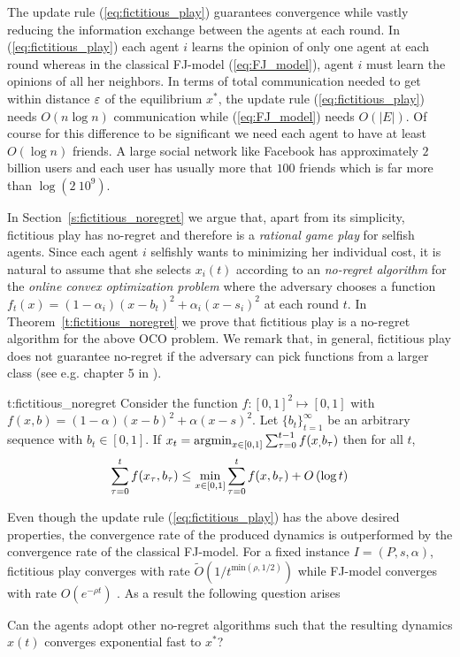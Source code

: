 The update rule (\ref{eq:fictitious_play}) guarantees convergence
while vastly reducing the information exchange between the agents
at each round. In (\ref{eq:fictitious_play}) each agent $i$ learns the opinion of only one agent
at each round whereas in the classical FJ-model (\ref{eq:FJ_model}), agent $i$ must
learn the opinions of all her neighbors. In terms of
total communication needed to get within distance $\varepsilon$ of the
equilibrium $x^*$, the update rule (\ref{eq:fictitious_play}) needs
$O(n \log n)$ communication while (\ref{eq:FJ_model}) needs
$O(|E|)$. Of course for this difference to be significant we need
each agent to have at least $O(\log n)$ friends. A large social
network like Facebook has approximately $2$ billion users and each user
has usually more that $100$ friends which is far more than $\log(2\ 10^9)$.

In Section~\ref{s:fictitious_noregret} we argue that, 
apart from its simplicity, fictitious play has no-regret
and therefore is a \emph{rational game play} for selfish agents.
Since each agent $i$ selfishly wants to minimizing her individual cost,
it is natural to assume that she selects $x_i(t)$ according to
an \emph{no-regret algorithm} for the \emph{online convex optimization problem}
where the adversary chooses a function $f_t(x)=(1-\alpha_i)(x-b_t)^2 + \alpha_i(x-s_i)^2$
at each round $t$. In Theorem~\ref{t:fictitious_noregret} 
we prove that fictitious play is a no-regret algorithm 
for the above OCO problem. We remark that, in general,
fictitious play does not guarantee no-regret if the adversary can pick
functions from a larger class (see e.g. chapter 5 in \cite{Haz16}).

\begin{reptheorem}{t:fictitious_noregret}
  Consider the function $f:[0,1]^2 \mapsto [0,1]$ with
  $f(x,b) = (1-\alpha)(x-b)^2 + \alpha(x-s)^2$.
  Let $\{b_t\}_{t=1}^\infty$ be an arbitrary sequence with
  $b_t \in [0,1]$. If $x_t = \operatorname*{argmin}_{x \in [0,1]}\sum_{\tau=0}^{t-1}f(x_,b_\tau)$
  then for all $t$,
  \[
    \sum_{\tau=0}^{t}f(x_\tau,b_\tau) \leq
    \min_{x \in [0,1]}\sum_{\tau=0}^tf(x,b_\tau) + O\left(\log t\right)
  \]
\end{reptheorem}

Even though the update rule (\ref{eq:fictitious_play}) has the above
desired properties, the convergence rate of the produced dynamics is
outperformed by the convergence rate of the classical FJ-model. For
a fixed instance $I=(P,s,\alpha)$, fictitious play converges with rate
$\widetilde{O}(1/t^{\text{min}(\rho,1/2)})$ while FJ-model
converges with rate $O(e^{-\rho t})$ \cite{GS14}.
As a result the following question arises
\begin{question}
  Can the agents adopt other no-regret algorithms such that the resulting
  dynamics $x(t)$ converges exponential fast to $x^*$?
\end{question}

